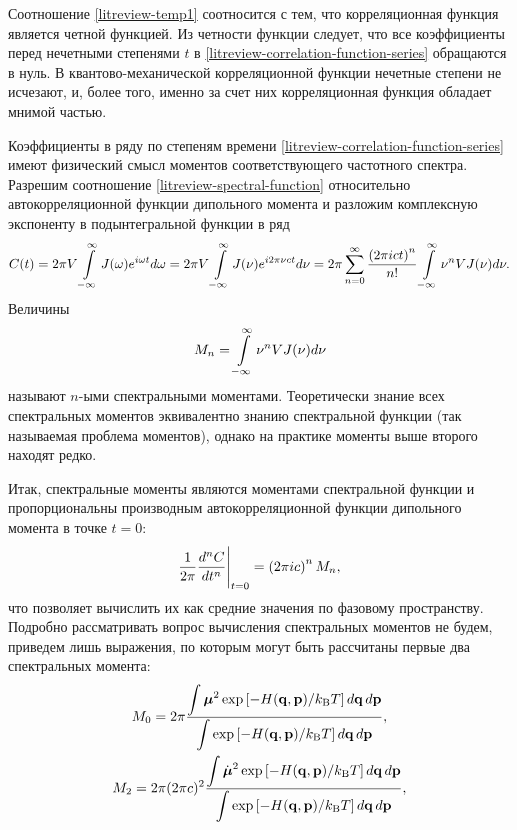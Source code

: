 Соотношение \eqref{litreview-temp1} соотносится с тем, что корреляционная функция является четной функцией. Из четности функции следует, что все коэффициенты перед нечетными степенями $t$ в \eqref{litreview-correlation-function-series} обращаются в нуль. В квантово-механической корреляционной функции нечетные степени не исчезают, и, более того, именно за счет них корреляционная функция обладает мнимой частью. \par
Коэффициенты в ряду по степеням времени \eqref{litreview-correlation-function-series} имеют физический смысл моментов соответствующего частотного спектра. Разрешим соотношение \eqref{litreview-spectral-function} относительно автокорреляционной функции дипольного момента и разложим комплексную экспоненту в подынтегральной функции в ряд
\begin{gather}
    C(t) = 2\pi V \int\limits_{-\infty}^\infty J(\omega) e^{i \omega t} d \omega = 2 \pi V \int\limits_{-\infty}^\infty J(\nu) e^{i 2\pi \nu c t} d\nu = 2 \pi \sum_{n = 0}^\infty \frac{\left( 2\pi i c t\right)^n}{n!} \int\limits_{-\infty}^\infty \nu^n V J(\nu) d\nu. 
\end{gather}
%
Величины
\begin{gather}
    M_n = \int\limits_{-\infty}^\infty \nu^n V J(\nu) d\nu \label{litreview-spectral-function-moments}
\end{gather}
%
называют $n$-ыми спектральными моментами. Теоретически знание всех спектральных моментов эквивалентно знанию спектральной функции (так называемая проблема моментов), однако на практике моменты выше второго находят редко. \par
Итак, спектральные моменты являются моментами спектральной функции и пропорциональны производным автокорреляционной функции дипольного момента в точке $t = 0$:
\begin{gather}
    \frac{1}{2 \pi} \frac{d^n C}{dt^n} \Bigg\vert_{t = 0} = \left( 2 \pi ic \right)^n M_n,
\end{gather}
%
что позволяет вычислить их как средние значения по фазовому пространству. Подробно рассматривать вопрос вычисления спектральных моментов не будем, приведем лишь выражения, по которым могут быть рассчитаны первые два спектральных момента:
\begin{gather}
    M_0 = 2 \pi \frac{\displaystyle \int \boldsymbol{\mu}^2 \exp \left[ -H(\mathbf{q}, \mathbf{p}) / k_\text{B} T \right] d\mathbf{q} \, d\mathbf{p}}{\displaystyle \int \exp \left[ -H(\mathbf{q}, \mathbf{p}) / k_\text{B} T \right] d\mathbf{q} \, d\mathbf{p}}, \label{litreview-m0-phase-space} \\
    M_2 = 2 \pi (2 \pi c)^2 \frac{\displaystyle \int \dot{\boldsymbol{\mu}}^2 \exp \left[ -H(\mathbf{q}, \mathbf{p}) / k_\text{B} T \right] d\mathbf{q} \, d\mathbf{p}}{\displaystyle \int \exp \left[ -H(\mathbf{q}, \mathbf{p}) / k_\text{B} T \right] d\mathbf{q} \, d\mathbf{p}}, \label{litreview-m2-phase-space}
\end{gather}
